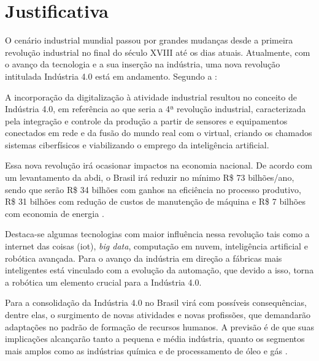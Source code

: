 \section{Justificativa}
\label{sec:justificativa}
O cenário industrial mundial passou por grandes mudanças desde a primeira revolução industrial no final do século XVIII até os dias atuais. Atualmente, com o avanço da tecnologia e a sua inserção na indústria, uma nova revolução intitulada Indústria 4.0 está em andamento. Segundo a :
\begin{quoting}[rightmargin=0cm,leftmargin=4cm]
\begin{singlespace}
{\footnotesize
A incorporação da digitalização à atividade industrial resultou no conceito de Indústria 4.0, em referência ao que seria a 4ª revolução industrial, caracterizada pela integração e controle da produção a partir de sensores e equipamentos conectados em rede e da fusão do mundo real com o virtual, criando os chamados sistemas ciberfísicos e viabilizando o emprego da inteligência artificial.
}
\end{singlespace}
\end{quoting}

Essa nova revolução irá ocasionar impactos na economia nacional. De acordo com um levantamento da \gls*{abdi}, o Brasil irá reduzir no mínimo R\$ 73 bilhões/ano, sendo que serão R\$ 34 bilhões com ganhos na eficiência no processo produtivo, R\$ 31 bilhões com redução de custos de manutenção de máquina e  R\$ 7 bilhões com economia de energia \cite{abdi}.

Destaca-se algumas tecnologias com maior influência nessa revolução tais como a internet das coisas (\gls*{iot}), \textit{big data}, computação em nuvem, inteligência artificial e robótica avançada. Para  o avanço da indústria em direção a fábricas mais inteligentes está vinculado com a evolução da automação, que devido a isso, torna a robótica um elemento crucial para a Indústria 4.0.

Para  a consolidação da Indústria 4.0 no Brasil virá com possíveis consequências, dentre elas, o surgimento de novas atividades e novas profissões, que demandarão adaptações no padrão de formação de recursos humanos. A previsão é de que suas implicações alcançarão tanto a pequena e média indústria, quanto os segmentos mais amplos como as indústrias química e de processamento de óleo e gás \cite{Gonzalez2018}.  

